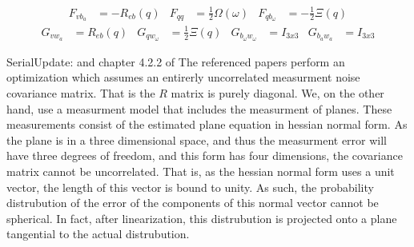 \documentclass[]{article}
\begin{document}
{%

\begin{align}
	F_{vb_a} &= -R_{eb}(q)
&
	F_{qq}	&= \frac{1}{2} \Omega(\omega)
&
	F_{qb_\omega} &= -\frac{1}{2} \Xi(q)
\end{align}
\begin{align}
	G_{vw_a} &= R_{eb}(q)
&
	G_{qw_\omega} &= \frac{1}{2} \Xi(q)
&
	G_{b_\omega w_\omega} &= I_{3x3}
&
	G_{b_a w_a} &= I_{3x3}
\end{align}


SerialUpdate: \cite{OpenPilotPaper} and chapter 4.2.2 of \cite{KFBookSerialupdate}
The referenced papers perform an optimization which assumes an entirerly uncorrelated measurment noise covariance matrix. That is the $R$ matrix is purely diagonal.
We, on the other hand, use a measurment model that includes the measurment of planes. These measurements consist of the estimated plane equation in hessian normal form. As the plane is in a three dimensional space, and thus the measurment error will have three degrees of freedom, and this form has four dimensions, the covariance matrix cannot be uncorrelated.
That is, as the hessian normal form uses a unit vector, the length of this vector is bound to unity. As such, the probability distrubution of the error of the components of this normal vector cannot be spherical.
In fact, after linearization, this distrubution is projected onto a plane tangential to the actual distrubution. 

}
\end{document}
